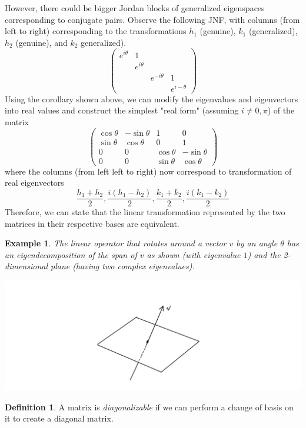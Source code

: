 \documentclass{article}
\newtheorem{example}{Example}[section]
\theoremstyle{remark}
\theoremstyle{definition}
\newtheorem{definition}{Definition}[section]
\begin{document}
However, there could be bigger Jordan blocks of generalized eigenspaces corresponding to conjugate pairs. Observe the following JNF, with columns (from left to right) corresponding to the transformations $h_1$ (genuine), $k_1$ (generalized), $h_2$ (genuine), and $k_2$ generalized). 
\[\begin{pmatrix}
e^{i \theta} & 1 & & \\
& e^{i \theta} & & \\
& & e^{-i \theta} & 1 \\
& & & e^{i- \theta}
\end{pmatrix}\]
Using the corollary shown above, we can modify the eigenvalues and eigenvectors into real values and construct the simplest "real form" (assuming $i \neq 0, \pi$) of the matrix 
\[\begin{pmatrix}
\cos{\theta} & - \sin{\theta} & 1 & 0 \\
\sin{\theta} & \cos{\theta} & 0 & 1 \\
0 & 0 & \cos{\theta} & - \sin{\theta} \\
0 & 0 & \sin{\theta} & \cos{\theta}
\end{pmatrix}\]
where the columns (from left left to right) now correspond to transformation of real eigenvectors
\[\frac{h_1 + h_2}{2}, \frac{i(h_1 - h_2)}{2}, \frac{k_1 + k_2}{2}, \frac{i(k_1 - k_2)}{2}\]
Therefore, we can state that the linear transformation represented by the two matrices in their respective bases are equivalent. 

\begin{example}
The linear operator that rotates around a vector $v$ by an angle $\theta$ has an eigendecomposition of the span of $v$ as shown (with eigenvalue $1$) and the 2-dimensional plane (having two complex eigenvalues). 
\begin{center}
    \includegraphics[scale=0.25]{img/Rotation_Map_Eigendecomposition.PNG}
\end{center}
\end{example}

\begin{definition}
A matrix is \textit{diagonalizable} if we can perform a change of basis on it to create a diagonal matrix. 
\end{definition}
\end{document}

